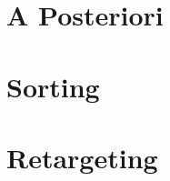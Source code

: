 \section{A Posteriori}
\label{ch:Content2:sec:APosteriori}




\section{Sorting}
\label{ch:Content2:sec:Sorting}




\section{Retargeting}
\label{ch:Content2:sec:Retargeting}




